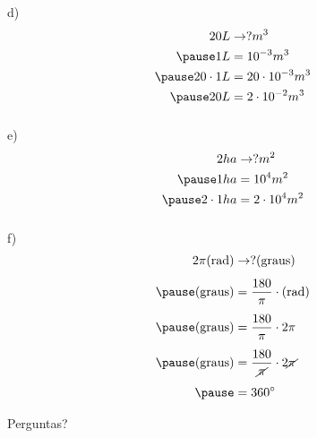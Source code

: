 \documentclass{beamer}
\begin{document}
\begin{frame}\frametitle{\subsecname}
    d)
    \begin{align*}
        20L &\rightarrow ? m^3\\ \pause
        1L &= 10^{-3}m^3 \\ \pause
        20\cdot 1L&=20\cdot10^{-3}m^3\\ \pause
        20L &= 2\cdot 10^{-2}m^3
    \end{align*}
\end{frame}

\begin{frame}\frametitle{\subsecname}
    e)
    \begin{align*}
        2ha &\rightarrow ? m^2\\ \pause
        1ha &= 10^{4}m^2 \\ \pause
        2\cdot 1ha&=2\cdot10^{4}m^2
    \end{align*}
\end{frame}

\begin{frame}\frametitle{\subsecname}
    f)
    \begin{align*}
        2\pi \text{(rad)} &\rightarrow ? \text{(graus)}\\[1ex] \pause
        \text{(graus)} &= \frac{180}{\pi}\cdot\text{(rad)} \\[1ex] \pause
        \text{(graus)} &= \frac{180}{\pi}\cdot2\pi \\[1ex] \pause
        \text{(graus)} &= \frac{180}{\cancel{\pi}}\cdot2\cancel{\pi} \\[1ex]\pause
         &= 360^\circ
    \end{align*}
\end{frame}


\begin{frame}
    \Huge{\centerline{Perguntas?}}
\end{frame}

\end{document}
